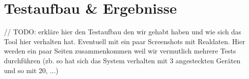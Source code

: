 \section{Testaufbau \& Ergebnisse}
\label{sec:test}

// TODO: erkläre hier den Testaufbau den wir gehabt haben und wie sich das Tool hier verhalten hat. Eventuell mit ein paar Screenshots mit Realdaten. Hier werden ein paar Seiten zusammenkommen weil wir vermutlich mehrere Tests durchführen (zb. so hat sich das System verhalten mit 3 angesteckten Geräten und so mit 20, ...)